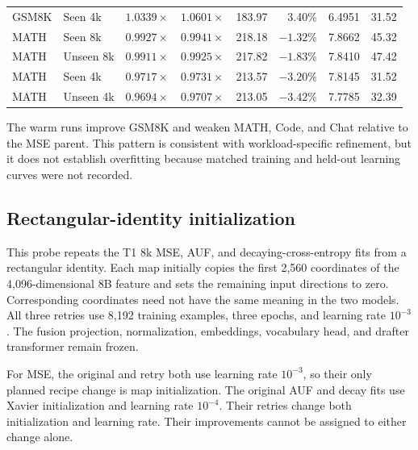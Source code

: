 \begin{table}[htbp]
\begin{tabular}{llrrrrrr}
GSM8K & Seen 4k & $1.0339\times$ & $1.0601\times$ & 183.97 & 3.40\% & 6.4951 & 31.52 \\
MATH & Seen 8k & $0.9927\times$ & $0.9941\times$ & 218.18 & $-1.32\%$ & 7.8662 & 45.32 \\
MATH & Unseen 8k & $0.9911\times$ & $0.9925\times$ & 217.82 & $-1.83\%$ & 7.8410 & 47.42 \\
MATH & Seen 4k & $0.9717\times$ & $0.9731\times$ & 213.57 & $-3.20\%$ & 7.8145 & 31.52 \\
MATH & Unseen 4k & $0.9694\times$ & $0.9707\times$ & 213.05 & $-3.42\%$ & 7.7785 & 32.39 \\
\bottomrule
\end{tabular}
\end{table}

The warm runs improve GSM8K and weaken MATH, Code, and Chat relative to the MSE parent. This pattern is consistent with workload-specific refinement, but it does not establish overfitting because matched training and held-out learning curves were not recorded.

\subsection{Rectangular-identity initialization}
\label{app:identity-init}

This probe repeats the T1 8k MSE, AUF, and decaying-cross-entropy fits from a rectangular identity. Each map initially copies the first 2,560 coordinates of the 4,096-dimensional 8B feature and sets the remaining input directions to zero. Corresponding coordinates need not have the same meaning in the two models. All three retries use 8,192 training examples, three epochs, and learning rate $10^{-3}$. The fusion projection, normalization, embeddings, vocabulary head, and drafter transformer remain frozen.

For MSE, the original and retry both use learning rate $10^{-3}$, so their only planned recipe change is map initialization. The original AUF and decay fits use Xavier initialization and learning rate $10^{-4}$. Their retries change both initialization and learning rate. Their improvements cannot be assigned to either change alone.

